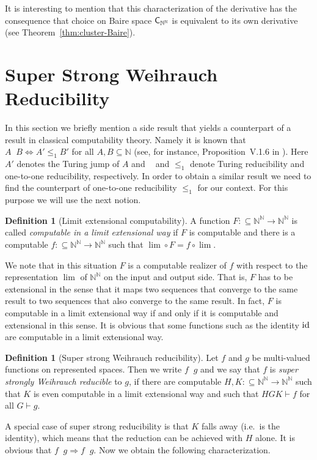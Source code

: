 \documentclass[a4paper]{amsart}
\def\IN{{\mathbb{N}}}
\def\TO{\Longrightarrow}
\def\In{\subseteq}
\def\id{{\rm id}}
\def\Baire{{\IN^\IN}}
\def\C{\mbox{\rm\sffamily C}}
\def\leqT{\mathop{\leq_{\mathrm{T}}}}
\def\leqSW{\mathop{\leq_{\mathrm{sW}}}}
\def\leqSSW{\mathop{\leq_{\mathrm{ssW}}}}
\theoremstyle{definition}
\newtheorem{definition}[theorem]{Definition}
\begin{document}
It is interesting to mention that this characterization of the derivative has the consequence
that choice on Baire space $\C_\Baire$ is equivalent to its own derivative (see Theorem~\ref{thm:cluster-Baire}).


\section{Super Strong Weihrauch Reducibility}

In this section we briefly mention a side result that yields a counterpart of a result
in classical computability theory. Namely it is known that $A\leqT B\iff A'\leq_1 B'$ for all $A,B\In\IN$
(see, for instance, Proposition~V.1.6 in \cite{Odi89}).
Here $A'$ denotes the Turing jump of $A$ and $\leqT$ and $\leq_1$ denote Turing reducibility and 
one-to-one reducibility, respectively. In order to obtain a similar result we need to find the 
counterpart of one-to-one reducibility $\leq_1$ for our context.
For this purpose we will use the next notion.

\begin{definition}[Limit extensional computability]
A function $F:\In\Baire\to\Baire$ is called {\em computable in a limit extensional way}
if $F$ is computable and there is a computable $f:\In\Baire\to\Baire$ such that
$\lim\circ F=f\circ\lim$.
\end{definition}

We note that in this situation $F$ is a computable realizer of $f$ with respect to the representation
$\lim$ of $\Baire$ on the input and output side.
That is, $F$ has to be extensional in the sense that it maps two sequences that converge to the same result
to two sequences that also converge to the same result.
In fact, $F$ is computable in a limit extensional way if and only if it is computable and extensional
in this sense.
It is obvious that some functions such as the identity $\id$ are computable in a limit extensional way.

\begin{definition}[Super strong Weihrauch reducibility]
Let $f$ and $g$ be multi-valued functions on represented spaces.
Then we write $f\leqSSW g$ and we say that $f$ is {\em super strongly Weihrauch reducible} to $g$,
if there are computable $H,K:\In\Baire\to\Baire$ such that $K$ is even computable in a limit extensional
way and such that $HGK\vdash f$ for all $G\vdash g$.
\end{definition}

A special case of super strong reducibility is that $K$ falls away (i.e.\ is the identity),
which means that the reduction can be achieved with $H$ alone.
It is obvious that $f\leqSSW  g\TO f\leqSW g$. Now we obtain the following
characterization.
\end{document}
